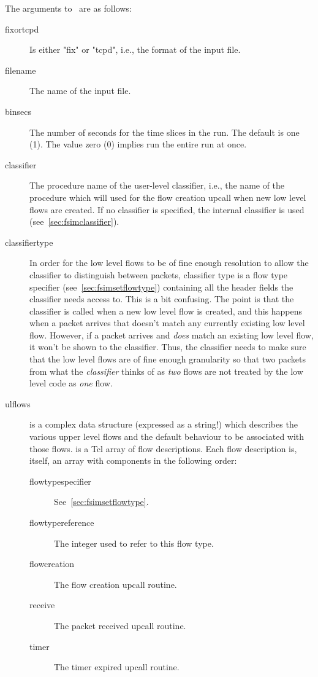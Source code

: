 \documentclass{article}
\begin{document}
The arguments to \cmdname\ are as follows:
\begin{description}
\item[fixortcpd] Is either "fix" or "tcpd", i.e., the format of the
input file.
\item[filename] The name of the input file.
\item[binsecs] The number of seconds for the time slices in the run.
The default is one (1).  The value zero (0) implies run the entire run
at once.
\item[classifier] The procedure name of the user-level classifier,
i.e., the name of the procedure which will used for the flow creation
upcall when new low level flows are created.  If no classifier is
specified, the internal classifier  is used
(see~\ref{sec:fsimclassifier}).
\item[classifiertype] In order for the low level flows to be of fine
enough resolution to allow the classifier to distinguish between
packets, classifier type is a flow type specifier
(see~\ref{sec:fsimsetflowtype}) containing all the header fields the
classifier needs access to.  This is a bit confusing.  The point is
that the classifier is called when a new low level flow is created, and
this happens when a packet arrives that doesn't match any currently
existing low level flow.  However, if a packet arrives and \emph{does}
match an existing low level flow, it won't be shown to the classifier.
Thus, the classifier needs to make sure that the low level flows are
of fine enough granularity so that two packets from what the
\emph{classifier} thinks of as \emph{two} flows are not treated by the
low level code as \emph{one} flow.
\item[ulflows]   is a complex data structure (expressed
as a string!) which describes the various upper level flows and the
default behaviour to be associated with those flows.  
is a Tcl array of flow descriptions.  Each flow description is, itself,
an array with components in the following order:
\begin{description}
\item[flowtypespecifier] See~\ref{sec:fsimsetflowtype}.
\item[flowtypereference] The integer used to refer to this flow type.
\item[flowcreation] The flow creation upcall routine.
\item[receive] The packet received upcall routine.
\item[timer] The timer expired upcall routine.
\end{description}
\end{description}
\end{document}
